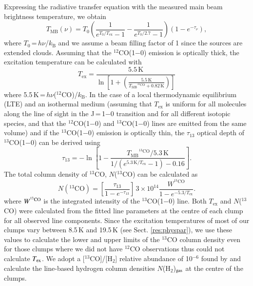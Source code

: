 \documentclass[printer]{aa}
\begin{document}
Expressing the radiative transfer equation with the measured main beam brightness temperature, we obtain
\begin{equation}
T\mathrm{_{MB}}(\nu) = T\mathrm{_0}\left(\frac{1}{e^{T\mathrm{_0}/T\mathrm{_{ex}}}-1}-\frac{1}{e^{T\mathrm{_0}/2.7}-1}\right)(1-e^{-\tau_{\nu}}),
\end{equation}
where $T_0$\,=\,$h\nu$/$k\mathrm{_B}$ and we assume a beam filling factor of 1 since the sources are extended clouds. Assuming that the $^{12}$CO(1$-$0) emission is optically thick, the excitation temperature can be calculated with
\begin{equation}
T\mathrm{_{ex}}=\frac{5.5\,\mathrm{K}}{\ln \left[1+\left(\frac{5.5\,\mathrm{K}}{T\mathrm{_{MB}}^{^{12}\mathrm{CO}}+0.82\,\mathrm{K}}\right)\right]}
\label{co_tkin}
\end{equation}
where  5.5\,K\,=\,$h\nu$($^{12}$CO)/$k\mathrm{_B}$. In the case of a local thermodynamic equilibrium (LTE) and an isothermal medium (assuming that $T\mathrm{_{ex}}$ is uniform for all molecules along the line of sight in the J\,=\,1$-$0 transition and for all different isotopic species, and that the $^{12}$CO(1$-$0) and $^{13}$CO(1$-$0) lines are emitted from the same volume) and if the $^{13}$CO(1$-$0) emission is optically thin, the $\tau_{13}$ optical depth of $^{13}$CO(1$-$0) can be derived using
\begin{equation}
\tau_{13}=-\ln\left[1-\frac{T\mathrm{_{MB}}^{^{13}\mathrm{CO}}/5.3\,\mathrm{K}}{1/(e^{5.3\,\mathrm{K}/T\mathrm{_{ex}}}-1)-0.16}\right].
\end{equation}
The total column density of $^{13}$CO, $N$($^{13}$CO) can be calculated as
\begin{equation}
N({^{13}\mathrm{CO}})=\left[\frac{\tau_{13}}{1-e^{-\tau_{13}}}\right]\,3\times10^{14}\frac{W^{^{13}\mathrm{CO}}}{1-e^{-5.3/T\mathrm{_{ex}}}}.
\label{cocoldens}
\end{equation}
where $W^{\rm ^{13}CO}$ is the integrated intensity of the $^{13}$CO(1$-$0) line. Both $T\mathrm{_{ex}}$ and $N$($^{13}$CO) were calculated from the fitted line parameters at the centre of each clump for all observed line components. Since the excitation temperatures of most of our clumps vary between 8.5\,K and 19.5\,K (see Sect. \ref{res:physpar}), we use these values to calculate the lower and upper limits of the $^{13}$CO column density even for those clumps where we did not have $^{12}$CO observations thus could not calculate $T_{\rm ex}$. We adopt a [$^{13}$CO]/[H$_2$] relative abundance of 10$^{-6}$ found by \citet{parikka2015} and calculate the line-based hydrogen column densities $N$(H$_2$)$_{\rm gas}$ at the centre of the clumps.
\end{document}
